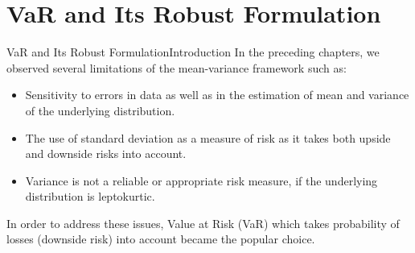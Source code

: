 \documentclass{beamer}
\begin{document}
\section{VaR and Its Robust Formulation}

\begin{frame}{VaR and Its Robust Formulation}{Introduction}
In the preceding chapters, we observed several limitations of the mean-variance framework such as:
\begin{itemize}
    \item Sensitivity to errors in data as well as in the
estimation of mean and variance of the underlying distribution.
    \item The use of standard deviation as a measure of risk as it takes both upside and downside risks into account.
    \item Variance is not a reliable or appropriate risk measure, if the underlying distribution is leptokurtic.
\end{itemize}

In order to address these issues, Value at Risk (VaR) which takes probability of losses (downside risk) into account became the popular choice.

\end{frame}
\end{document}
